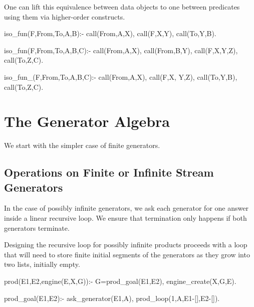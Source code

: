 \documentclass{new_tlp}
\begin{document}
One can lift this equivalence between data objects to one between predicates using them via higher-order constructs.

\begin{code}

%
iso_fun(F,From,To,A,B):-
  call(From,A,X),
  call(F,X,Y),
  call(To,Y,B).

%
iso_fun(F,From,To,A,B,C):- %
  call(From,A,X),
  call(From,B,Y),
  call(F,X,Y,Z),
  call(To,Z,C).

%
iso_fun_(F,From,To,A,B,C):- 
  call(From,A,X),
  call(F,X, Y,Z), %
  call(To,Y,B),
  call(To,Z,C).
\end{code}

\section{The Generator Algebra}
We start with the simpler case of finite generators.
 



\subsection{Operations on Finite or  Infinite Stream Generators}

In the case of possibly infinite generators, we  ask each generator for one answer inside a linear recursive loop. We ensure that termination only happens if both generators terminate.
\begin{code}
\end{code}

Designing the recursive loop for possibly infinite products
proceeds with a loop that will need to store finite initial 
segments of the generators as they grow into two lists, initially
empty.
\begin{code}
prod(E1,E2,engine(E,X,G)):-
  G=prod_goal(E1,E2),
  engine_create(X,G,E).

prod_goal(E1,E2):-
  ask_generator(E1,A),
  prod_loop(1,A,E1-[],E2-[]).
\end{code}
\end{document}
